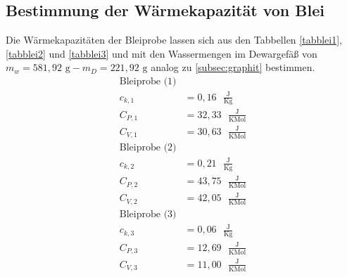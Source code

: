 \subsection{Bestimmung der Wärmekapazität von Blei} \label{subsec:blei}
  
Die Wärmekapazitäten der Bleiprobe lassen sich aus den Tabbellen \ref{tabblei1}, \ref{tabblei2} und 
\ref{tabblei3} und mit den Wassermengen im Dewargefäß von $m_w=581,92\text{ g}-m_D=221,92\text{ g}$ 
analog zu \ref{subsec:graphit} bestimmen.
\begin{align}
\text{Bleiprobe (1)}\nonumber \\
c_{k,1}&=0,16 \text{ }\frac{\text{J}}{\text{K} \text{g}} \\
C_{P,1}&=32,33 \text{ }\frac{\text{J}}{\text{K} \text{Mol}} \\
C_{V,1}&=30,63  \text{ }\frac{\text{J}}{\text{K} \text{Mol}} \\
\text{Bleiprobe (2)}\nonumber \\
c_{k,2}&=0,21 \text{ }\frac{\text{J}}{\text{K} \text{g}} \\
C_{P,2}&=43,75 \text{ }\frac{\text{J}}{\text{K} \text{Mol}} \\
C_{V,2}&=42,05  \text{ }\frac{\text{J}}{\text{K} \text{Mol}} \\
\text{Bleiprobe (3)}\nonumber \\
c_{k,3}&=0,06 \text{ }\frac{\text{J}}{\text{K} \text{g}} \\
C_{P,3}&=12,69 \text{ }\frac{\text{J}}{\text{K} \text{Mol}} \\
C_{V,3}&=11,00  \text{ }\frac{\text{J}}{\text{K} \text{Mol}} 
\end{align}


